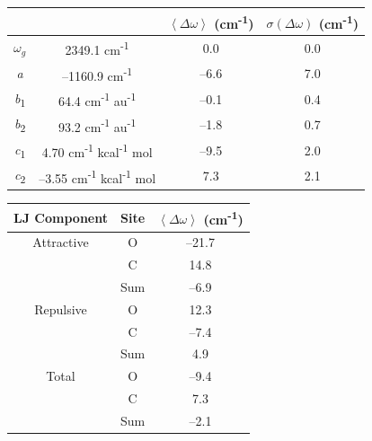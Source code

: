 \documentclass[]{article}
\begin{document}
\begin{table}
  \centering
  \caption{Parameters of the spectroscopic map for the  asymmetric stretch frequency in \ce{[C4C1im][PF6]}.  This map predicts the  with a regression coefficient \(R = 0.94\) and a root mean square error of 2.7 cm\textsuperscript{-1}. The average shift, \(\left\langle \Delta\omega \right\rangle\), and standard deviation, \(\sigma(\Delta\omega)\), are reported for each term in the map.}
  \label{paper_03:tab1}
  \begin{longtable}[]{@{}cccc@{}}
    \toprule
    & & \(\left\langle \Delta\omega \right\rangle\) (cm\textsuperscript{-1}) &
    \(\sigma(\Delta\omega)\) (cm\textsuperscript{-1})\tabularnewline
    \midrule
    \endhead
    \(\omega_{g}\) & 2349.1 cm\textsuperscript{-1} & 0.0 &
    0.0\tabularnewline
    \emph{a} & --1160.9 cm\textsuperscript{-1} & --6.6 & 7.0\tabularnewline
    \emph{b}\textsubscript{1} & 64.4 cm\textsuperscript{-1}
    au\textsuperscript{-1} & --0.1 & 0.4\tabularnewline
    \emph{b}\textsubscript{2} & 93.2 cm\textsuperscript{-1}
    au\textsuperscript{-1} & --1.8 & 0.7\tabularnewline
    \emph{c}\textsubscript{1} & 4.70 cm\textsuperscript{-1}
    kcal\textsuperscript{-1} mol & --9.5 & 2.0\tabularnewline
    \emph{c}\textsubscript{2} & --3.55 cm\textsuperscript{-1}
    kcal\textsuperscript{-1} mol & 7.3 & 2.1\tabularnewline
    \bottomrule
  \end{longtable}
\end{table}

\begin{table}
  \centering
  \caption{Decomposition of the average LJ contribution to the spectroscopic map for the  asymmetric stretch frequency in \ce{[C4C1im][PF6]} into attractive and repulsive components.}
  \label{paper_03:tab2}
  \begin{longtable}[]{@{}ccc@{}}
    \toprule
    LJ Component & Site & \(\left\langle \Delta\omega \right\rangle\)
    (cm\textsuperscript{-1})\tabularnewline
    \midrule
    \endhead
    Attractive & O & --21.7\tabularnewline
    & C & 14.8\tabularnewline
    & Sum & --6.9\tabularnewline
    Repulsive & O & 12.3\tabularnewline
    & C & --7.4\tabularnewline
    & Sum & 4.9\tabularnewline
    Total & O & --9.4\tabularnewline
    & C & 7.3\tabularnewline
    & Sum & --2.1\tabularnewline
    \bottomrule
  \end{longtable}
\end{table}
\end{document}
